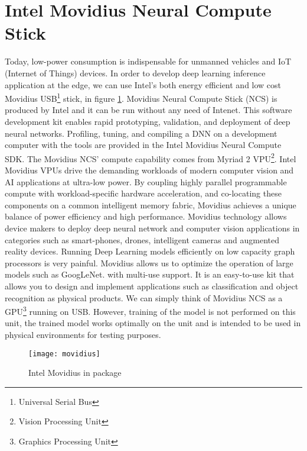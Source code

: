 \section{Intel Movidius Neural Compute Stick}
\label{sec:movidius}
Today, low-power consumption is indispensable for unmanned vehicles and IoT 
(Internet of Things) devices.
In order to develop deep learning inference application at the edge, we can use 
Intel’s both energy efficient and low cost Movidius 
USB\footnote{Universal Serial Bus} stick, in figure \ref{fig:movidius}.
Movidius Neural Compute Stick (NCS) is produced by Intel and it can be run 
without any need of Intenet. 
This software development kit enables rapid prototyping, validation, and 
deployment of deep neural networks. 
Profiling, tuning, and compiling a DNN on a development computer with the tools 
are provided in the Intel Movidius Neural Compute SDK.
The Movidius NCS’ compute capability comes from Myriad 2 VPU\footnote{Vision Processing Unit}.
Intel Movidius VPUs drive the demanding workloads of  modern computer vision 
and AI applications at ultra-low power. 
By coupling highly parallel programmable compute with workload-specific hardware 
acceleration, and co-locating these components on a common intelligent memory 
fabric, Movidius achieves a unique balance of power efficiency and high performance. 
Movidius technology allows device makers to deploy deep neural network and 
computer vision applications in categories such as smart-phones, drones, 
intelligent cameras and augmented reality devices.
Running Deep Learning models efficiently on low capacity graph processors is very painful. 
Movidius allows us to optimize the operation of large models such as GoogLeNet.
with multi-use support.
It is an easy-to-use kit that allows you to design and implement applications 
such as classification and object recognition as physical products.
We can simply think of Movidius NCS as a GPU\footnote{Graphics Processing Unit} 
running on USB. 
However, training of the model is not performed on this unit, the trained model 
works optimally on the unit and is intended to be used in physical environments 
for testing purposes.
%
\begin{figure}[htb]
\centering
\texttt{[image: movidius]}
\caption{Intel Movidius in package}
\label{fig:movidius}
\end{figure}
%

